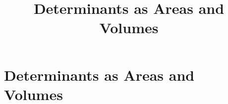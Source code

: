 \documentclass{ximera}
\title{Determinants as Areas and Volumes} \license{CC BY-NC-SA 4.0}
\begin{document}
\begin{abstract}
 \end{abstract}
\maketitle

\section*{Determinants as Areas and Volumes}


  
  

 
\end{document}
